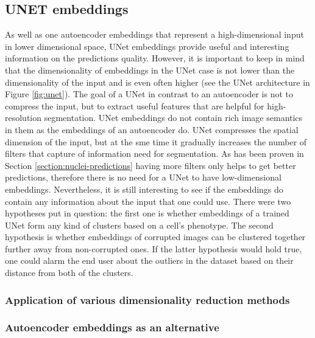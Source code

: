\subsection{UNET embeddings}
    \label{section:unet-embeddings-study}
    As well as one autoencoder embeddings that represent a high-dimensional input in lower dimensional space, UNet embeddings provide useful and interesting information on the predictions quality. However, it is important to keep in mind that the dimensionality of embeddings in the UNet case is not lower than the dimensionality of the input and is even often higher (see the UNet architecture in Figure \ref{fig:unet}). The goal of a UNet in contrast to an autoencoder is not to compress the input, but to extract useful features that are helpful for high-resolution segmentation. UNet embeddings do not contain rich image semantics in them as the embeddings of an autoencoder do. UNet compresses the spatial dimension of the input, but at the sme time it gradually increases the number of filters that capture of information need for segmentation. As has been proven in Section \ref{section:nuclei-predictions} having more filters only helps to get better predictions, therefore there is no need for a UNet to have low-dimensional embeddings. Nevertheless, it is still interesting to see if the embeddings do contain any information about the input that one could use. There were two hypotheses put in question: the first one is whether embeddings of a trained UNet form any kind of clusters based on a cell's phenotype. The second hypothesis is whether embeddings of corrupted images can be clustered together further away from non-corrupted ones. If the latter hypothesis would hold true, one could alarm the end user about the outliers in the dataset based on their distance from both of the clusters. 
    \subsubsection{Application of various dimensionality reduction methods}
        \label{section:unet-embeddings-dim-reduction}
        
    \subsubsection{Autoencoder embeddings as an alternative}
        
